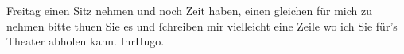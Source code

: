\begin{ledgroupsized}[t]{13cm}
                  Freitag einen Sitz nehmen und noch Zeit haben, einen gleichen für
               mich zu nehmen bitte thuen Sie es und ſchreiben mir vielleicht eine Zeile wo ich Sie
               für’s Theater abholen kann.\pend
           \pstart Ihr\spacefill\mbox{Hugo.}\pend{}\endnumbering{}\end{ledgroupsized}  \newcommand{\dateiname}{L00731}\newcommand{\titel}{Hugo von Hofmannsthal an Arthur Schnitzler, 12. 10. 1897}\newcommand{\editorInnen}{Martin Anton Müller und Gerd-Hermann Susen}
      